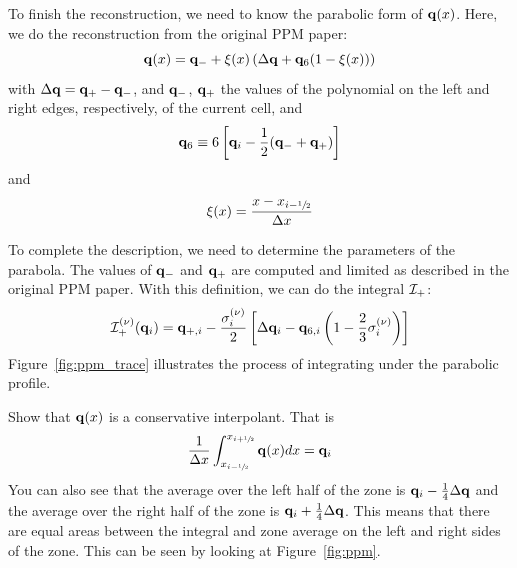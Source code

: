 To finish the reconstruction, we need to know the parabolic form
of ${\bf q}(x)$.  Here, we do the reconstruction from the original PPM
paper:
\begin{equation}
{\bf q}(x) = {\bf q}_{-} + \xi(x) \left ( \Delta {\bf q} + {\bf q}_6 (1 - \xi(x) ) \right )
\end{equation}
with $\Delta {\bf q} = {\bf q}_+ - {\bf q}_-$, and ${\bf q}_-$, ${\bf q}_+$ the values of the polynomial
on the left and right edges, respectively, of the current cell, and
\begin{equation}
{\bf q}_6 \equiv 6 \left [ {\bf q}_i - \frac{1}{2} ({\bf q}_- + {\bf q}_+) \right ]
\end{equation}
and
\begin{equation}
\xi(x) = \frac{x - x_{i-{\sfrac{1}{2}}}}{\Delta x}
\end{equation}

To complete the description, we need to determine the parameters of
the parabola.  The values of ${\bf q}_-$ and ${\bf q}_+$ are computed and limited
as described in the original PPM paper.  With this definition, we can
do the integral ${\mathcal{I}}_+$:
\begin{equation}
{\mathcal{I}}_+^{(\nu)}({\bf q}_i) = {\bf q}_{+,i} - \frac{\sigma_i^{(\nu)}}{2}
   \left [ \Delta {\bf q}_i - {\bf q}_{6,i} \left ( 1 - \frac{2}{3} \sigma_i^{(\nu)} \right ) \right ]
\end{equation}
Figure~\ref{fig:ppm_trace} illustrates the process of integrating under
the parabolic profile.


\begin{exercise}
{Show that ${\bf q}(x)$ is a conservative interpolant.  That is
\begin{equation}
\frac{1}{\Delta x} \int_{x_{i-{\sfrac{1}{2}}}}^{x_{i+{\sfrac{1}{2}}}} {\bf q}(x) dx = {\bf q}_i
\end{equation}
You can also see that the average over the left half of the zone is
${\bf q}_i -\frac{1}{4}\Delta {\bf q}$ and the average over the right half of the
zone is ${\bf q}_i + \frac{1}{4}\Delta {\bf q}$.  This means that there are equal
areas between the integral and zone average on the left and right
sides of the zone.  This can be seen by looking at
Figure~\ref{fig:ppm}.  }
\end{exercise}

